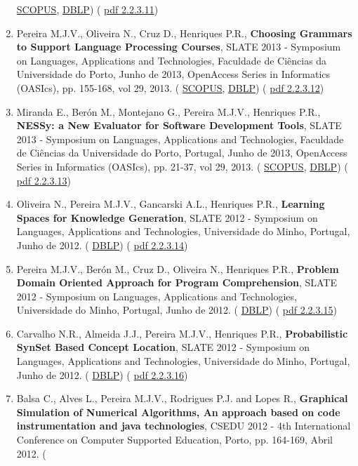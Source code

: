 \documentclass[11pt]{article}
\begin{document}
\begin{enumerate}
{\href{run:Publicacoes/PublicacoesSCOPUS.pdf}{SCOPUS}, 
\href{run:Publicacoes/ComprovativosDBLP.pdf}{DBLP}) (
\href{run:Publicacoes/publicacoes/76.pdf}{pdf 2.2.3.11})}
\item{Pereira M.J.V., Oliveira N., Cruz D., Henriques P.R., {
\bf{ Choosing Grammars to Support Language Processing Courses}}, SLATE 2013 - Symposium on Languages, Applications and Technologies, Faculdade de Ciências da Universidade do Porto, Junho de 2013, OpenAccess Series in Informatics (OASIcs), pp. 155-168, vol 29, 2013. (
\href{run:Publicacoes/PublicacoesSCOPUS.pdf}{SCOPUS}, 
\href{run:Publicacoes/ComprovativosDBLP.pdf}{DBLP}) (
\href{run:Publicacoes/publicacoes/71.pdf}{pdf 2.2.3.12})}
\item{Miranda E., Berón M., Montejano G., Pereira M.J.V., Henriques P.R., {
\bf{ NESSy: a New Evaluator for Software Development Tools}}, SLATE 2013 - Symposium on Languages, Applications and Technologies, Faculdade de Ciências da Universidade do Porto, Portugal, Junho de 2013, OpenAccess Series in Informatics (OASIcs), pp. 21-37, vol 29, 2013. (
\href{run:Publicacoes/PublicacoesSCOPUS.pdf}{SCOPUS}, 
\href{run:Publicacoes/ComprovativosDBLP.pdf}{DBLP}) (
\href{run:Publicacoes/publicacoes/72.pdf}{pdf 2.2.3.13})}
\item{Oliveira N., Pereira M.J.V., Gancarski A.L., Henriques P.R., {
\bf{ Learning Spaces for Knowledge Generation}}, SLATE 2012 - Symposium on Languages, Applications and Technologies, Universidade do Minho, Portugal, Junho de 2012. (
\href{run:Publicacoes/ComprovativosDBLP.pdf}{DBLP}) (
\href{run:Publicacoes/publicacoes/69.pdf}{pdf 2.2.3.14})}
\item{Pereira M.J.V., Berón M., Cruz D., Oliveira N., Henriques P.R., {
\bf{ Problem Domain Oriented Approach for Program Comprehension}}, SLATE 2012 - Symposium on Languages, Applications and Technologies, Universidade do Minho, Portugal, Junho de 2012. (
\href{run:Publicacoes/ComprovativosDBLP.pdf}{DBLP}) (
\href{run:Publicacoes/publicacoes/68.pdf}{pdf 2.2.3.15})}
\item{Carvalho N.R., Almeida J.J., Pereira M.J.V., Henriques P.R., {
\bf{ Probabilistic SynSet Based Concept Location}}, SLATE 2012 - Symposium on Languages, Applications and Technologies, Universidade do Minho, Portugal, Junho de 2012. (
\href{run:Publicacoes/ComprovativosDBLP.pdf}{DBLP}) (
\href{run:Publicacoes/publicacoes/64.pdf}{pdf 2.2.3.16})}
\item{Balsa C., Alves L., Pereira M.J.V., Rodrigues P.J. and Lopes R., {
\bf{ Graphical Simulation of Numerical Algorithms, An approach based on code instrumentation and java technologies}}, CSEDU 2012 - 4th International Conference on Computer Supported Education, Porto, pp. 164-169, Abril 2012. (
}
\end{enumerate}
\end{document}
